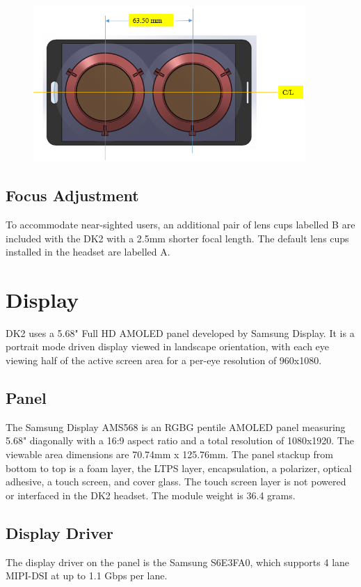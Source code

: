 \documentclass[letterpaper]{article}
\begin{document}
\begin{figure}[H]  
  \centering
    \includegraphics[width=0.92\textwidth]{Figures/image7-27.png}
\end{figure}

\subsection{Focus Adjustment}
To accommodate near-sighted users, an additional pair of lens cups labelled B are included with the DK2 with a 2.5mm shorter focal length.  The default lens cups installed in the headset are labelled A.  \\ 

\newpage

\section{Display}
DK2 uses a 5.68" Full HD AMOLED panel developed by Samsung Display. It is a portrait mode driven display viewed in landscape orientation, with each eye viewing half of the active screen area for a per-eye resolution of 960x1080.

\subsection{Panel}
The Samsung Display AMS568 is an RGBG pentile AMOLED panel measuring 5.68" diagonally with a 16:9 aspect ratio and a total resolution of 1080x1920. The viewable area dimensions are 70.74mm x 125.76mm.  The panel stackup from bottom to top is a foam layer, the LTPS layer, encapsulation, a polarizer, optical adhesive, a touch screen, and cover glass.  The touch screen layer is not powered or interfaced in the DK2 headset.  The module weight is 36.4 grams.

\subsection{Display Driver}
The display driver on the panel is the Samsung S6E3FA0, which supports 4 lane MIPI-DSI at up to 1.1 Gbps per lane.
\end{document}
